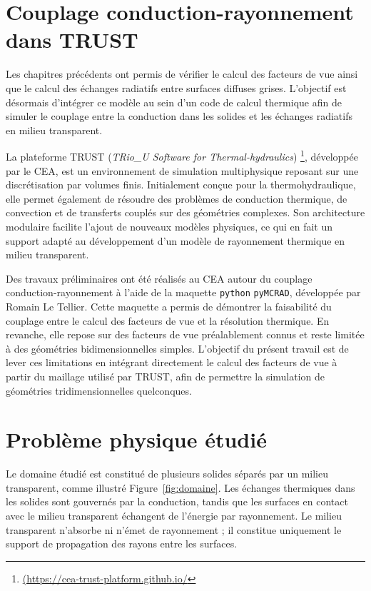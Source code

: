 \section{Couplage conduction-rayonnement dans TRUST}


Les chapitres précédents ont permis de vérifier le calcul des facteurs de vue ainsi que le calcul des échanges radiatifs entre surfaces diffuses grises. L'objectif est désormais d'intégrer ce modèle au sein d'un code de calcul thermique afin de simuler le couplage entre la conduction dans les solides et les échanges radiatifs en milieu transparent.

La plateforme \textsc{TRUST} (\textit{TRio\_U Software for Thermal-hydraulics}) \footnote{\url{(https://cea-trust-platform.github.io/}}\cite{saikali2025trust}, développée par le CEA, est un environnement de simulation multiphysique reposant sur une discrétisation par volumes finis. Initialement conçue pour la thermohydraulique, elle permet également de résoudre des problèmes de conduction thermique, de convection et de transferts couplés sur des géométries complexes. Son architecture modulaire facilite l'ajout de nouveaux modèles physiques, ce qui en fait un support adapté au développement d'un modèle de rayonnement thermique en milieu transparent.

Des travaux préliminaires ont été réalisés au CEA autour du couplage conduction-rayonnement à l'aide de la maquette \texttt{python} \texttt{pyMCRAD}, développée par Romain Le Tellier. Cette maquette a permis de démontrer la faisabilité du couplage entre le calcul des facteurs de vue et la résolution thermique. En revanche, elle repose sur des facteurs de vue préalablement connus et reste limitée à des géométries bidimensionnelles simples. L'objectif du présent travail est de lever ces limitations en intégrant directement le calcul des facteurs de vue à partir du maillage utilisé par \textsc{TRUST}, afin de permettre la simulation de géométries tridimensionnelles quelconques.




\section{Problème physique étudié}

Le domaine étudié est constitué de plusieurs solides séparés par un milieu transparent, comme illustré Figure~\ref{fig:domaine}. Les échanges thermiques dans les solides sont gouvernés par la conduction, tandis que les surfaces en contact avec le milieu transparent échangent de l'énergie par rayonnement. Le milieu transparent n'absorbe ni n'émet de rayonnement ; il constitue uniquement le support de propagation des rayons entre les surfaces.

